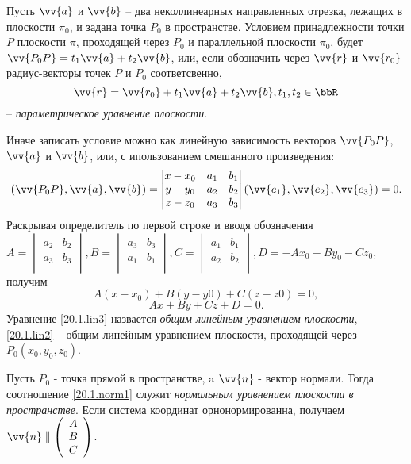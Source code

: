 Пусть $\vv{a}$ и $\vv{b}$ -- два неколлинеарных направленных отрезка, лежащих в плоскости $\pi_0$, и задана точка $P_0$ в пространстве. Условием принадлежности точки $P$ плоскости $\pi$, проходящей через $P_0$ и параллельной плоскости $\pi_0$, будет $\vv{P_0P}=t_1\vv{a}+t_2\vv{b}$, или, если обозначить через $\vv{r}$ и $\vv{r_0}$ радиус-векторы точек $P$ и $P_0$ соответсвенно,
\begin{equation}\label{20.1.par3}
\vv{r}=\vv{r_0}+t_1\vv{a}+t_2\vv{b}, t_1,t_2 \in \bbR
\end{equation}
-- \textit{параметрическое уравнение плоскости}.

Иначе записать условие можно как линейную зависимость векторов $\vv{P_0P}$, $\vv{a}$ и $\vv{b}$, или, с ипользованием смешанного произведения:
\begin{equation}\label{20.1.mix1}
(\vv{P_0P},\vv{a}, \vv{b})=\begin{vmatrix}
x-x_0 & a_1 & b_1 \\
y-y_0 & a_2 & b_2 \\
z-z_0 & a_3 & b_3 \\
\end{vmatrix}(\vv{e_1},\vv{e_2},\vv{e_3})=0.
\end{equation}
Раскрывая определитель по первой строке и вводя обозначения $A=\begin{vmatrix}
a_2 & b_2 \\
a_3 & b_3 \\
\end{vmatrix}, B=\begin{vmatrix}
a_3 & b_3 \\
a_1 & b_1 \\
\end{vmatrix}, C=\begin{vmatrix}
a_1 & b_1 \\
a_2 & b_2 \\
\end{vmatrix}, D=-Ax_0-By_0-Cz_0$, получим
\begin{equation}\label{20.1.lin2}
A(x-x_0)+B(y-y0)+C(z-z0)=0,
\end{equation}
\begin{equation}\label{20.1.lin3}
Ax+By+Cz+D=0.
\end{equation}
Уравнение \ref{20.1.lin3} назвается \textit{общим линейным уравнением плоскости}, \ref{20.1.lin2} -- общим линейным уравнением плоскости, проходящей через $P_0(x_0,y_0,z_0)$.

  Пусть $P_0$ - точка прямой в пространстве, a $\vv{n}$ - вектор нормали. Тогда соотношение \ref{20.1.norm1} служит \textit{нормальным уравнением плоскости в пространстве}. Если система координат орнонормированна, получаем $\vv{n}\parallel\left(\begin{array}{crl}
A\\
B\\
C\\
\end{array}\right)$.

